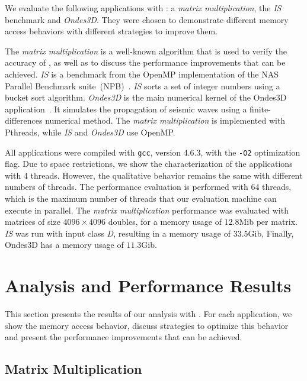 We evaluate the following applications with \TABARNAC: a \emph{matrix multiplication}, the \emph{IS} benchmark and \emph{Ondes3D}.
They were chosen to demonstrate different memory access behaviors with different strategies to improve them.

The \emph{matrix multiplication} is a well-known algorithm that is used to verify the accuracy of \TABARNAC, as well as to discuss the performance improvements that can be achieved.
\emph{IS} is a benchmark from the OpenMP implementation of the NAS Parallel Benchmark suite~(NPB)~\cite{Jin1999}. \emph{IS} sorts a set of integer numbers using a bucket sort algorithm.
\emph{Ondes3D} is the main numerical kernel of the Ondes3D application~\cite{Dupros2008}. It simulates the propagation of seismic waves using a finite-differences numerical method.
The \emph{matrix multiplication} is implemented with Pthreads, while \emph{IS} and \emph{Ondes3D} use OpenMP.

All applications were compiled with \texttt{gcc}, version 4.6.3, with the \texttt{-O2} optimization flag.
Due to space restrictions, we show the characterization of the applications
with 4 threads. However, the qualitative behavior remains the same with different numbers of threads. The performance evaluation is performed with 64 threads,
which is the maximum number of threads that our evaluation machine can execute
in parallel. The \emph{matrix multiplication} performance was evaluated with
matrices of size $4096 \times 4096$ doubles, for a memory usage of $12.8$Mib per matrix. \emph{IS} was run
with input class \emph{D}, resulting in a memory usage of $33.5$Gib, Finally, Ondes3D has a memory usage of $11.3$Gib.

\section{Analysis and Performance Results}
\label{sec:expe-analysis}

This section presents the results of our analysis with \TABARNAC.
For each application, we show the memory access behavior, discuss strategies to optimize this behavior and present the performance improvements that can be achieved.


\subsection{Matrix Multiplication}
\label{sec:exp-mat}

